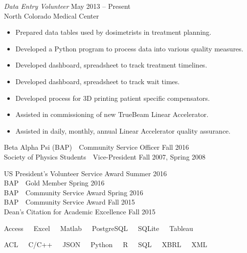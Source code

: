 \documentclass[11pt]{article}
\begin{document}
\begin{description}[leftmargin=!,labelwidth=2cm,align=right]
    {\sl Data Entry Volunteer} \hfill May 2013 -- Present\\North Colorado Medical Center
    \begin{itemize}[rightmargin=2cm,noitemsep]
        \item Prepared data tables used by dosimetrists in treatment planning.
        \item Developed a Python program to process data into various quality measures.
        \item Developed dashboard, spreadsheet to track treatment timelines.
        \item Developed dashboard, spreadsheet to track wait times.
        \item Developed process for 3D printing patient specific compensators.
        \item Assisted in commissioning of new TrueBeam Linear Accelerator.
        \item Assisted in daily, monthly, annual Linear Accelerator quality assurance.
    \end{itemize}

\item[Leadership]
    Beta Alpha Psi (BAP)\ \ Community Service Officer \hfill Fall 2016\\
    Society of Physics Students\ \ Vice-President \hfill Fall 2007, Spring 2008

\item[Awards]
    US President's Volunteer Service Award \hfill Summer 2016\\
    BAP\ \ Gold Member \hfill Spring 2016\\
    BAP\ \ Community Service Award \hfill Spring 2016\\
    BAP\ \ Community Service Award \hfill   Fall 2015\\
    Dean's Citation for Academic Excellence \hfill Fall 2015

\item[Tools]
    Access\ \ \ Excel\ \ \ Matlab\ \ \ PostgreSQL\ \ \ SQLite\ \ \ Tableau

\item[Languages]
    ACL\ \ \ C/C++\ \ \ JSON\ \ \ Python\ \ \ R\ \ \ SQL\ \ \ XBRL\ \ \ XML\\\ \\



\end{description}
\end{document}
